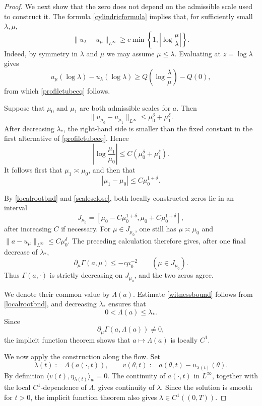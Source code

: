 \documentclass[11pt,a4paper]{article}
\numberwithin{equation}{section}
\theoremstyle{plain}
\theoremstyle{remark}
\begin{document}
\begin{proof}
We next show that the zero does not depend on the admissible scale
used to construct it. The formula \eqref{cylindricformula} implies that, for sufficiently small $\lambda,\mu$,
\begin{equation}\label{profiletubeeq}
\|u_\lambda-u_\mu\|_{L^\infty}
\geq
c\min\left\{
1,\left|\log\frac{\mu}{\lambda}\right|
\right\}.
\end{equation}
Indeed, by symmetry in $\lambda$ and $\mu$ we may assume $\mu\leq\lambda$. Evaluating at
$z=\log\lambda$ gives
$$
u_\mu(\log\lambda)-u_\lambda(\log\lambda)
\geq
Q\left(\log\frac{\lambda}{\mu}\right)-Q(0),
$$
from which \eqref{profiletubeeq} follows.

Suppose that $\mu_0$ and $\mu_1$ are both admissible
scales for $a$. Then
$$
\|u_{\mu_0}-u_{\mu_1}\|_{L^\infty}
\leq
\mu_0^\delta+\mu_1^\delta.
$$
After decreasing $\lambda_*$, the right-hand side is smaller than
the fixed constant in the first alternative of
\eqref{profiletubeeq}. Hence
$$
\left|\log\frac{\mu_1}{\mu_0}\right|
\leq
C(\mu_0^\delta+\mu_1^\delta).
$$
It follows first that $\mu_1\asymp\mu_0$, and then that
\begin{equation}\label{scalesclose}
|\mu_1-\mu_0|
\leq
C\mu_0^{1+\delta}.
\end{equation}

By \eqref{localrootbnd} and
\eqref{scalesclose}, both locally constructed zeros
lie in an interval
$$
J_{\mu_0}
=
\left[
\mu_0-C\mu_0^{1+\delta},
\mu_0+C\mu_0^{1+\delta}
\right],
$$
after increasing $C$ if necessary. For
$\mu\in J_{\mu_0}$, one still has
$\mu\asymp\mu_0$ and $\|a-u_\mu\|_{L^\infty}
\leq
C\mu_0^\delta$. The preceding calculation therefore gives, after one final decrease
of $\lambda_*$,
$$
\partial_\mu \Gamma(a,\mu)
\leq
-c\mu_0^{-2}
\qquad
(\mu\in J_{\mu_0}).
$$
Thus $\Gamma(a,\cdot)$ is strictly decreasing on
$J_{\mu_0}$, and the two zeros agree.

We denote their common value by $\Lambda(a)$. Estimate
\eqref{witnessbound} follows from
\eqref{localrootbnd}, and decreasing $\lambda_*$ ensures
that
$$
0<\Lambda(a)\leq\lambda_*.
$$
Since
$$
\partial_\mu \Gamma(a,\Lambda(a))\neq0,
$$
the implicit function theorem shows that $a\mapsto\Lambda(a)$ is
locally $C^1$.

We now apply the construction along the flow. Set
$$
\lambda(t):=\Lambda(a(\cdot,t)),
\qquad
v(\theta,t):=a(\theta,t)-u_{\lambda(t)}(\theta).
$$
By definition $\langle v(t),\eta_{\lambda(t)}\rangle_w=0$. The continuity of $a(\cdot,t)$ in $L^\infty$, together with the
local $C^1$-dependence of $\Lambda$, gives continuity of
$\lambda$. Since the solution is smooth for $t>0$, the implicit
function theorem also gives $\lambda\in C^1((0,T))$.



\end{proof}
\end{document}
